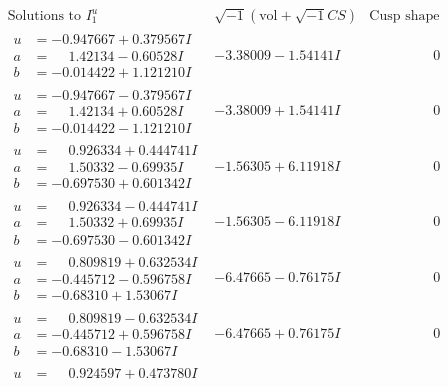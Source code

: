 \documentclass[1p]{elsarticle_modified}
\theoremstyle{definition}
\newcommand{\I}{\sqrt{-1}}
\begin{document}
$$\begin{array}{c|c|c}  
\text{Solutions to }I^u_{1}& \I (\text{vol} + \sqrt{-1}CS) & \text{Cusp shape}\\
 \hline 
\begin{aligned}
u &= -0.947667 + 0.379567 I \\
a &= \phantom{-}1.42134 - 0.60528 I \\
b &= -0.014422 + 1.121210 I\end{aligned}
 & -3.38009 - 1.54141 I & \phantom{-0.000000 } 0 \\ \hline\begin{aligned}
u &= -0.947667 - 0.379567 I \\
a &= \phantom{-}1.42134 + 0.60528 I \\
b &= -0.014422 - 1.121210 I\end{aligned}
 & -3.38009 + 1.54141 I & \phantom{-0.000000 } 0 \\ \hline\begin{aligned}
u &= \phantom{-}0.926334 + 0.444741 I \\
a &= \phantom{-}1.50332 - 0.69935 I \\
b &= -0.697530 + 0.601342 I\end{aligned}
 & -1.56305 + 6.11918 I & \phantom{-0.000000 } 0 \\ \hline\begin{aligned}
u &= \phantom{-}0.926334 - 0.444741 I \\
a &= \phantom{-}1.50332 + 0.69935 I \\
b &= -0.697530 - 0.601342 I\end{aligned}
 & -1.56305 - 6.11918 I & \phantom{-0.000000 } 0 \\ \hline\begin{aligned}
u &= \phantom{-}0.809819 + 0.632534 I \\
a &= -0.445712 - 0.596758 I \\
b &= -0.68310 + 1.53067 I\end{aligned}
 & -6.47665 - 0.76175 I & \phantom{-0.000000 } 0 \\ \hline\begin{aligned}
u &= \phantom{-}0.809819 - 0.632534 I \\
a &= -0.445712 + 0.596758 I \\
b &= -0.68310 - 1.53067 I\end{aligned}
 & -6.47665 + 0.76175 I & \phantom{-0.000000 } 0 \\ \hline\begin{aligned}
u &= \phantom{-}0.924597 + 0.473780 I \\

\end{aligned}
\end{array}$$
\end{document}
